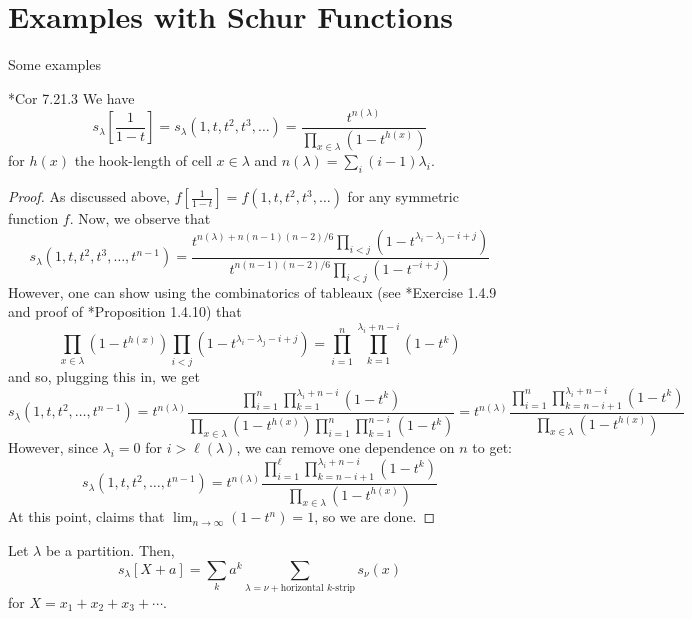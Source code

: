 \documentclass[11pt,leqno,oneside]{amsart}
\numberwithin{thm}{section}
\begin{document}
\section{Examples with Schur Functions}
Some examples
\begin{prop}
  \cite{stanley}*{Cor 7.21.3} We have \[
    s_\lambda\left[\frac{1}{1-t}\right] =
    s_\lambda(1,t,t^2,t^3,\ldots) = \frac{t^{n(\lambda)}}{\prod_{x \in
      \lambda} (1-t^{h(x)})}
\]
for \(h(x)\) the hook-length of cell \(x \in \lambda\) and
\(n(\lambda) = \sum_i (i-1)\lambda_i\).
\end{prop}
\begin{proof}
  As discussed above, \(f\left[ \frac{1}{1-t} \right] =
  f(1,t,t^2,t^3,\ldots)\) for any symmetric function \(f\). Now, 
  we observe that \[
    s_\lambda(1,t,t^2,t^3, \ldots, t^{n-1}) =
    \frac{t^{n(\lambda)+n(n-1)(n-2)/6 }\prod_{i <
          j}(1-t^{\lambda_i-\lambda_j-i+j})}{t^{n(n-1)(n-2)/6}\prod_{i<j}(1-t^{-i+j})}
    \]
    However, one can show using the combinatorics of tableaux (see
    \cite{manivel}*{Exercise 1.4.9} and proof of \cite{manivel}*{Proposition 1.4.10}) that \[
      \prod_{x \in \lambda}(1-t^{h(x)})
      \prod_{i<j}(1-t^{\lambda_i-\lambda_j-i+j}) = \prod_{i=1}^n \prod_{k=1}^{\lambda_i+n-i}(1-t^k)
    \]
    and so, plugging this in, we get \[
      s_\lambda(1,t,t^2,\ldots,t^{n-1}) =  t^{n(\lambda)}
      \frac{\prod_{i=1}^n \prod_{k=1}^{\lambda_i+n-i}(1-t^k)}{\prod_{x
        \in \lambda} (1-t^{h(x)}) \prod_{i=1}^n
      \prod_{k=1}^{n-i}(1-t^k) } = t^{n(\lambda)} \frac{\prod_{i=1}^n
      \prod_{k=n-i+1}^{\lambda_i+n-i}(1-t^k)}{\prod_{x \in \lambda}(1-t^{h(x)})}
  \]
  However, since \(\lambda_i = 0\) for \(i > \ell(\lambda)\), we can
  remove one dependence on \(n\) to get: \[
      s_\lambda(1,t,t^2,\ldots,t^{n-1}) = t^{n(\lambda)} \frac{\prod_{i=1}^\ell
      \prod_{k=n-i+1}^{\lambda_i+n-i}(1-t^k)}{\prod_{x \in \lambda}(1-t^{h(x)})}
  \]
  At this point, \cite{stanley} claims that \(\lim_{n \to \infty}
  (1-t^{n}) = 1\), so we are done.  
\end{proof}
\begin{prop}
  Let \(\lambda\) be a partition. Then, \[
    s_\lambda[X+a] = \sum_k a^k \sum_{\lambda = \nu+\text{horizontal }k\text{-strip}} s_\nu(x)
  \]
  for \(X = x_1+x_2+x_3+\cdots\).
\end{prop}
\end{document}
